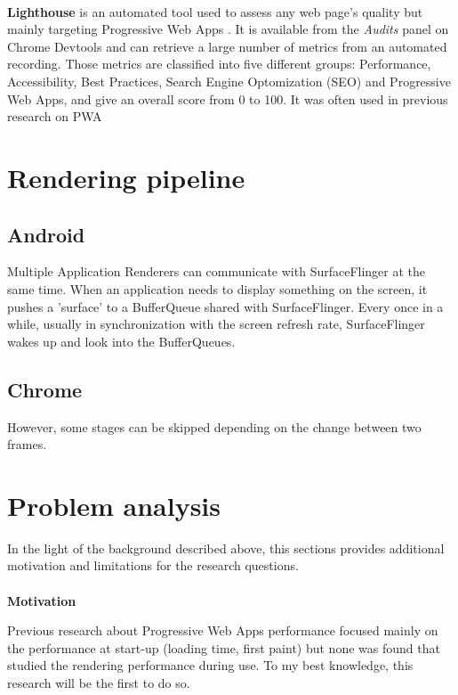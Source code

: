 \paragraph{}
\textbf{Lighthouse} \cite{lighthouse} is an automated  tool used to assess any web page's quality but mainly targeting Progressive Web Apps \cite{PWApossibleUnifer}. It is available from the \textit{Audits} panel on Chrome Devtools and can retrieve a large number of metrics from an automated recording. Those metrics are classified into five different groups: Performance, Accessibility, Best Practices, Search Engine Optomization (SEO) and Progressive Web Apps, and give an overall score from 0 to 100. It was often used in previous research on PWA \cite{}

\section{Rendering pipeline}

\subsection{Android}
Multiple Application Renderers can communicate with SurfaceFlinger at the same time.   When an application needs to display something on the screen, it pushes a 'surface' to a BufferQueue shared with SurfaceFlinger. Every once in a while, usually in synchronization with the screen refresh rate, SurfaceFlinger wakes up and look into the BufferQueues.

\subsection{Chrome}
However, some stages can be skipped depending on the change between two frames.

\section{Problem analysis}
In the light of the background described above, this sections provides additional motivation and limitations for the research questions. 
\paragraph{}
\textbf{Motivation} \newline

Previous research about Progressive Web Apps performance focused mainly on the performance at start-up (loading time, first paint) but none was found that studied the rendering performance during use. To my best knowledge, this research will be the first to do so.

